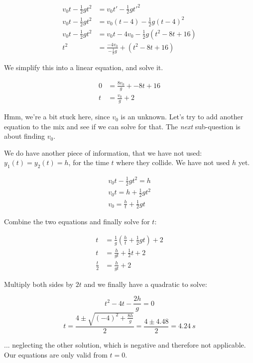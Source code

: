 \documentclass[12pt,a4paper]{report}
\begin{document}
\begin{align}
v_0 t - \frac{1}{2} g t^2 &= v_0 t' - \frac{1}{2} g t'^2\\
v_0 t - \frac{1}{2} g t^2 &= v_0 (t - 4) - \frac{1}{2} g (t - 4)^2\\
v_0 t - \frac{1}{2} g t^2 &= v_0 t - 4 v_0 - \frac{1}{2} g (t^2 -8t + 16)\\
t^2 &= \frac{- 4 v_0}{- \frac{1}{2} g} + (t^2 -8t + 16)
\end{align}

We simplify this into a linear equation, and solve it.

\begin{align}
0 &= \frac{8v_0}{g} + -8t + 16\\
t &= \frac{v_0}{g} + 2
\end{align}

Hmm, we're a bit stuck here, since $v_0$ is an unknown. Let's try to add another equation to the mix and see if we can solve for that. The \emph{next} sub-question is about finding $v_0$.

We do have another piece of information, that we have not used: $y_1(t) = y_2(t) = h$, for the time $t$ where they collide. We have not used $h$ yet.

\begin{align}
v_0 t - \frac{1}{2} g t^2 = h\\
v_0 t = h + \frac{1}{2} g t^2\\
v_0 = \frac{h}{t} + \frac{1}{2} g t \label{h1p8:v0}
\end{align}

Combine the two equations and finally solve for $t$:

\begin{align}
t &= \frac{1}{g} \left(\frac{h}{t} + \frac{1}{2} g t\right) + 2\\
t &= \frac{h}{gt} + \frac{1}{2} t + 2\\
\frac{t}{2} &= \frac{h}{gt} + 2
\end{align}

Multiply both sides by $2t$ and we finally have a quadratic to solve:

\begin{equation}
t^2 - 4t - \frac{2h}{g} = 0
\end{equation}
\begin{equation}
t = \frac{4 \pm \sqrt{(-4)^2 + \frac{8h}{g}}}{2} = \frac{4 \pm 4.48}{2} = \SI{4.24}{s}
\end{equation}

... neglecting the other solution, which is negative and therefore not applicable. Our equations are only valid from $t = 0$.
\end{document}
